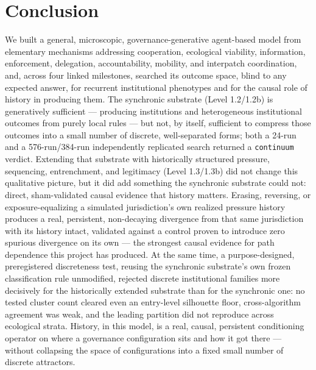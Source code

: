 \section{Conclusion}
\label{sec:conclusion}

We built a general, microscopic, governance-generative agent-based model
from elementary mechanisms addressing cooperation, ecological viability,
information, enforcement, delegation, accountability, mobility, and
interpatch coordination, and, across four linked milestones, searched its
outcome space, blind to any expected answer, for recurrent institutional
phenotypes and for the causal role of history in producing them. The
synchronic substrate (Level 1.2/1.2b) is generatively sufficient ---
producing institutions and heterogeneous institutional outcomes from
purely local rules --- but not, by itself, sufficient to compress those
outcomes into a small number of discrete, well-separated forms; both a
24-run and a 576-run/384-run independently replicated search returned a
\texttt{continuum} verdict. Extending that substrate with historically
structured pressure, sequencing, entrenchment, and legitimacy (Level
1.3/1.3b) did not change this qualitative picture, but it did add
something the synchronic substrate could not: direct, sham-validated
causal evidence that history matters. Erasing, reversing, or
exposure-equalizing a simulated jurisdiction's own realized pressure
history produces a real, persistent, non-decaying divergence from that
same jurisdiction with its history intact, validated against a control
proven to introduce zero spurious divergence on its own --- the strongest
causal evidence for path dependence this project has produced. At the same
time, a purpose-designed, preregistered discreteness test, reusing the
synchronic substrate's own frozen classification rule unmodified, rejected
discrete institutional families more decisively for the historically
extended substrate than for the synchronic one: no tested cluster count
cleared even an entry-level silhouette floor, cross-algorithm agreement was
weak, and the leading partition did not reproduce across ecological
strata. History, in this model, is a real, causal, persistent conditioning
operator on where a governance configuration sits and how it got there ---
without collapsing the space of configurations into a fixed small number
of discrete attractors.

